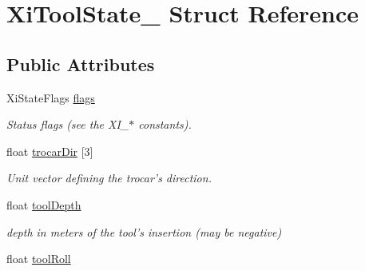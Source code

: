 \hypertarget{structXiToolState__}{
\section{XiToolState\_\- Struct Reference}
\label{structXiToolState__}
}
\subsection*{Public Attributes}
\begin{DoxyCompactItemize}
\item 
\hypertarget{structXiToolState___aa16122528d7ca411b0a53384847903e6}{
XiStateFlags \hyperlink{structXiToolState___aa16122528d7ca411b0a53384847903e6}{flags}}
\label{structXiToolState___aa16122528d7ca411b0a53384847903e6}

\begin{DoxyCompactList}\small\item\em Status flags (see the XI\_\-$\ast$ constants). \item\end{DoxyCompactList}\item 
\hypertarget{structXiToolState___a297f1c8571802585f6a581d19a8a71e0}{
float \hyperlink{structXiToolState___a297f1c8571802585f6a581d19a8a71e0}{trocarDir} \mbox{[}3\mbox{]}}
\label{structXiToolState___a297f1c8571802585f6a581d19a8a71e0}

\begin{DoxyCompactList}\small\item\em Unit vector defining the trocar's direction. \item\end{DoxyCompactList}\item 
\hypertarget{structXiToolState___abd5e75ccd590660aaa18dd07601577c6}{
float \hyperlink{structXiToolState___abd5e75ccd590660aaa18dd07601577c6}{toolDepth}}
\label{structXiToolState___abd5e75ccd590660aaa18dd07601577c6}

\begin{DoxyCompactList}\small\item\em depth in meters of the tool's insertion (may be negative) \item\end{DoxyCompactList}\item 
\hypertarget{structXiToolState___a2101625ed11143ac87d72e9c5fa73322}{
float \hyperlink{structXiToolState___a2101625ed11143ac87d72e9c5fa73322}{toolRoll}}
\label{structXiToolState___a2101625ed11143ac87d72e9c5fa73322}


\end{DoxyCompactItemize}
